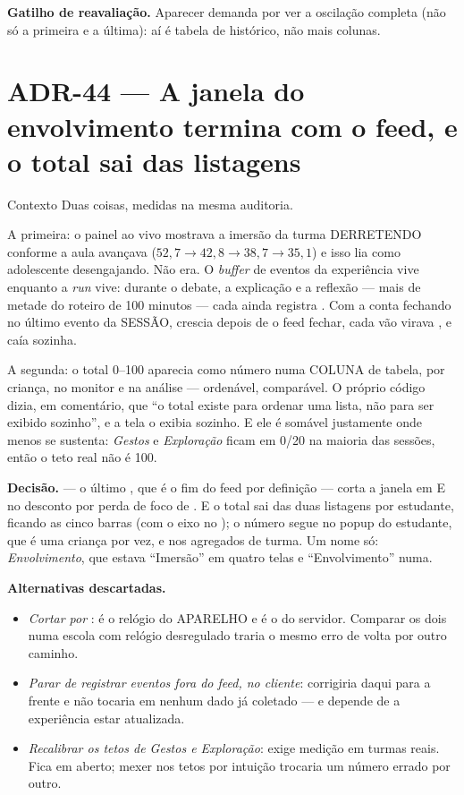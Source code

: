 \textbf{Gatilho de reavaliação.} Aparecer demanda por ver a oscilação completa
(não só a primeira e a última): aí é tabela de histórico, não mais colunas.


\section{ADR-44 --- A janela do envolvimento termina com o feed, e o total sai das listagens}
\label{adr:envolvimento}

\begin{especificacao}{Contexto}
Duas coisas, medidas na mesma auditoria.

A primeira: o painel ao vivo mostrava a imersão da turma DERRETENDO conforme a
aula avançava ($52{,}7 \rightarrow 42{,}8 \rightarrow 38{,}7 \rightarrow 35{,}1$)
e isso lia como adolescente desengajando. Não era. O \emph{buffer} de eventos da
experiência vive enquanto a \emph{run} vive: durante o debate, a explicação e a
reflexão --- mais de metade do roteiro de 100 minutos --- cada 
ainda registra . Com a conta fechando no último evento da
SESSÃO,  crescia depois de o feed fechar, cada vão virava
, e  caía sozinha.

A segunda: o total 0--100 aparecia como número numa COLUNA de tabela, por
criança, no monitor e na análise --- ordenável, comparável. O próprio código
dizia, em comentário, que ``o total existe para ordenar uma lista, não para ser
exibido sozinho'', e a tela o exibia sozinho. E ele é somável justamente onde
menos se sustenta: \emph{Gestos} e \emph{Exploração} ficam em 0/20 na maioria
das sessões, então o teto real não é 100.
\end{especificacao}

\textbf{Decisão.}  --- o último , que é o fim
do feed por definição --- corta a janela em  E no desconto por
perda de foco de . E o total sai das duas listagens por
estudante, ficando as cinco barras (com o eixo no ); o número segue no
popup do estudante, que é uma criança por vez, e nos agregados de turma. Um nome só:
\emph{Envolvimento}, que estava ``Imersão'' em quatro telas e ``Envolvimento''
numa.

\textbf{Alternativas descartadas.}
\begin{itemize}
  \item \emph{Cortar por }:  é o relógio do
    APARELHO e  é o do servidor. Comparar os dois numa escola com
    relógio desregulado traria o mesmo erro de volta por outro caminho.
  \item \emph{Parar de registrar eventos fora do feed, no cliente}: corrigiria
    daqui para a frente e não tocaria em nenhum dado já coletado --- e depende de
    a experiência estar atualizada.
  \item \emph{Recalibrar os tetos de Gestos e Exploração}: exige medição em
    turmas reais. Fica em aberto; mexer nos tetos por intuição trocaria um número
    errado por outro.
\end{itemize}

